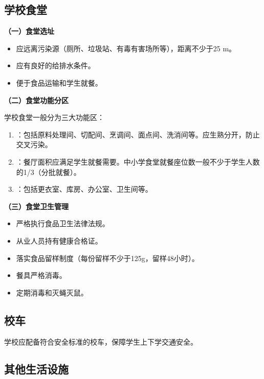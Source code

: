 \subsection{学校食堂}

\begin{keybox}
\textbf{（一）食堂选址}

\begin{itemize}[leftmargin=*]
    \item 应远离污染源（厕所、垃圾站、有毒有害场所等），距离不少于25 m。
    \item 应有良好的给排水条件。
    \item 便于食品运输和学生就餐。
\end{itemize}

\textbf{（二）食堂功能分区}

学校食堂一般分为三大功能区：

\begin{enumerate}[leftmargin=*]
    \item {}：包括原料处理间、切配间、烹调间、面点间、洗消间等。应生熟分开，防止交叉污染。
    \item {}：餐厅面积应满足学生就餐需要。中小学食堂就餐座位数一般不少于学生人数的1/3（分批就餐）。
    \item {}：包括更衣室、库房、办公室、卫生间等。
\end{enumerate}

\textbf{（三）食堂卫生管理}

\begin{itemize}[leftmargin=*]
    \item 严格执行食品卫生法律法规。
    \item 从业人员持有健康合格证。
    \item 落实食品留样制度（每份留样不少于125g，留样48小时）。
    \item 餐具严格消毒。
    \item 定期消毒和灭蝇灭鼠。
\end{itemize}
\end{keybox}

\subsection{校车}

\begin{defbox}
学校应配备符合安全标准的校车，保障学生上下学交通安全。
\end{defbox}

\subsection{其他生活设施}

